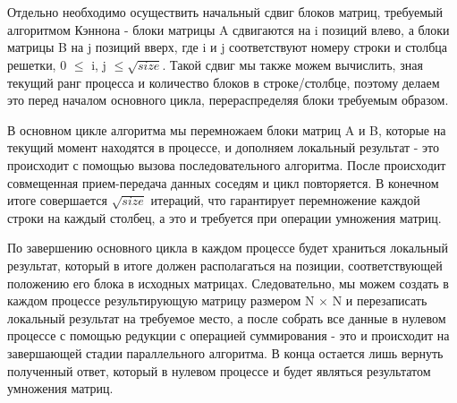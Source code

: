 \documentclass{report}
\begin{document}
\par Отдельно необходимо осуществить начальный сдвиг блоков матриц, требуемый алгоритмом Кэннона - блоки матрицы A сдвигаются на i позиций влево, а блоки матрицы B на j позиций вверх, где i и j соответствуют номеру строки и столбца решетки, 0 $ \leq $ i, j $ \leq \sqrt{size} $. Такой сдвиг мы также можем вычислить, зная текущий ранг процесса и количество блоков в строке/столбце, поэтому делаем это перед началом основного цикла, перераспределяя блоки требуемым образом.
\par В основном цикле алгоритма мы перемножаем блоки матриц A и B, которые на текущий момент находятся в процессе, и дополняем локальный результат - это происходит с помощью вызова последовательного алгоритма. После происходит совмещенная прием-передача данных соседям и цикл повторяется. В конечном итоге совершается $ \sqrt{size} $ итераций, что гарантирует перемножение каждой строки на каждый столбец, а это и требуется при операции умножения матриц.
\par По завершению основного цикла в каждом процессе будет храниться локальный результат, который в итоге должен располагаться на позиции, соответствующей положению его блока в исходных матрицах. Следовательно, мы можем создать в каждом процессе результирующую матрицу размером N $ \times $ N и перезаписать локальный результат на требуемое место, а после собрать все данные в нулевом процессе с помощью редукции с операцией суммирования - это и происходит на завершающей стадии параллельного алгоритма. В конца остается лишь вернуть полученный ответ, который в нулевом процессе и будет являться результатом умножения матриц.

\newpage

\end{document}
